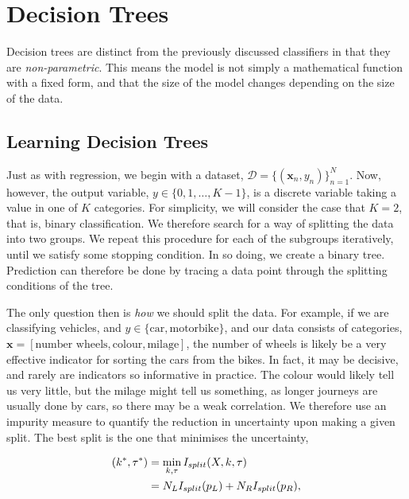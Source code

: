 \documentclass[11pt]{amsart}
\begin{document}
\section{Decision Trees}

Decision trees are distinct from the previously discussed classifiers in that they are \emph{non-parametric}. This means the model is not simply a mathematical function with a fixed form, and that the size of the model changes depending on the size of the data.

\subsection{Learning Decision Trees}

Just as with regression, we begin with a dataset, $\mathcal{D} = \{(\mathbf{x}_n, y_n)\}_{n=1}^{N}$. Now, however, the output variable, $y \in \{0, 1, \dots, K-1\}$, is a discrete variable taking a value in one of $K$ categories. For simplicity, we will consider the case that $K = 2$, that is, binary classification. We therefore search for a way of splitting the data into two groups. We repeat this procedure for each of the subgroups iteratively, until we satisfy some stopping condition. In so doing, we create a binary tree. Prediction can therefore be done by tracing a data point through the splitting conditions of the tree.

The only question then is \emph{how} we should split the data. For example, if we are classifying vehicles, and $y \in \{\text{car}, \text{motorbike}\}$, and our data consists of categories, $\mathbf{x} = [\text{number wheels}, \text{colour}, \text{milage}]$, the number of wheels is likely be a very effective indicator for sorting the cars from the bikes. In fact, it may be decisive, and rarely are indicators so informative in practice. The colour would likely tell us very little, but the milage might tell us something, as longer journeys are usually done by cars, so there may be a weak correlation. We therefore use an impurity measure to quantify the reduction in uncertainty upon making a given split. The best split is the one that minimises the uncertainty,

\begin{align}
( k^*, \tau^*) &= \min_{k, \tau} I_{split}(X, k, \tau) \notag \\
&= N_LI_{split}(p_L) + N_RI_{split}(p_R), \notag
\end{align}
\end{document}
